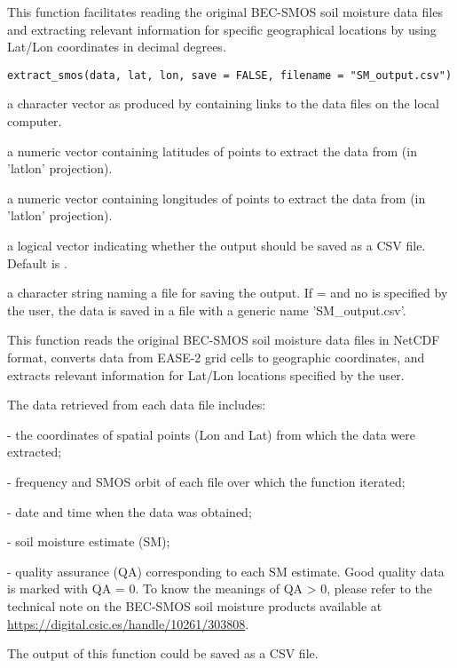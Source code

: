 \documentclass[a4paper]{book}
\begin{document}
%
\begin{Description}
This function facilitates reading the original BEC-SMOS soil moisture data
files and extracting relevant information for specific geographical locations
by using Lat/Lon coordinates in decimal degrees.
\end{Description}
%
\begin{Usage}
\begin{verbatim}
extract_smos(data, lat, lon, save = FALSE, filename = "SM_output.csv")
\end{verbatim}
\end{Usage}
%
\begin{Arguments}
\begin{ldescription}
\item[\code{data}] a character vector as produced by  containing
links to the data files on the local computer.

\item[\code{lat}] a numeric vector containing latitudes of points to extract the
data from (in 'latlon' projection).

\item[\code{lon}] a numeric vector containing longitudes of points to extract the
data from (in 'latlon' projection).

\item[\code{save}] a logical vector indicating whether the output should  be saved
as a CSV file. Default is .

\item[\code{filename}] a character string naming a file for saving the output. If
 =  and no  is specified by the user,
the data is saved in a file with a generic name 'SM\_output.csv'.
\end{ldescription}
\end{Arguments}
%
\begin{Details}
This function reads the original BEC-SMOS soil moisture data files in NetCDF
format, converts data from EASE-2 grid cells to geographic coordinates, and
extracts relevant information for Lat/Lon locations specified by the user.

The data retrieved from each data file includes:

- the coordinates of spatial points (Lon and Lat) from which the data were
extracted;

- frequency and SMOS orbit of each file over which the function iterated;

- date and time when the data was obtained;

- soil moisture estimate (SM);

- quality assurance (QA) corresponding to each SM estimate. Good quality data
is marked with QA = 0. To know the meanings of QA > 0, please refer to the
technical note on the BEC-SMOS soil moisture products available at
\url{https://digital.csic.es/handle/10261/303808}.

The output of this function could be saved as a CSV file.
\end{Details}
\end{document}
